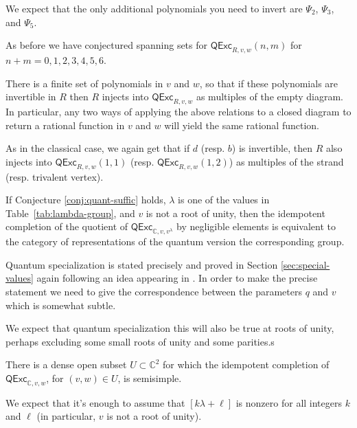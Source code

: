 \documentclass[12pt]{amsart}
\begin{document}
We expect that the only additional polynomials you need to invert are $\Psi_2$, $\Psi_3$, and $\Psi_5$.

As before we have conjectured spanning sets for $\mathsf{QExc}_{R,v,w}(n,m)$
for $n+m=0,1,2,3,4,5,6$.

\begin{conjecture}
  \label{conj:quant-consist}
There is a finite set of polynomials in $v$ and $w$, so that if these
polynomials are invertible in $R$ then $R$ injects into
$\mathsf{QExc}_{R,v,w}$ as multiples of the empty diagram.  In particular, any
two ways of applying the above relations to a closed diagram to return a
rational function in $v$ and $w$ will yield the same rational function.
\end{conjecture}

As in the classical case, we again get that if $d$ (resp. $b$) is invertible,
then $R$ also injects into $\mathsf{QExc}_{R,v,w}(1,1)$ (resp.
$\mathsf{QExc}_{R,v,w}(1,2)$) as multiples of the strand (resp. trivalent
vertex).

\begin{proposition}\label{prop:quant-spec}
  If Conjecture \ref{conj:quant-suffic} holds, $\lambda$ is one of
  the values in Table~\ref{tab:lambda-group},
  and $v$ is not a root of unity, then the idempotent completion of
  the quotient of
$\mathsf{QExc}_{\mathbb{C},v,v^\lambda}$ by negligible elements is
equivalent to the category of representations of the quantum version
the corresponding group.
\end{proposition}

Quantum specialization is stated precisely and proved in Section 
\ref{sec:special-values} again following an idea appearing in \cite{1709.01278}. 
In order to make the precise statement we need to give the correspondence
between the parameters $q$ and $v$ which is somewhat subtle.

We expect that quantum specialization this will also be true at roots of unity, 
perhaps excluding some small roots of unity and some parities.s

\begin{conjecture}
There is a dense open subset $U \subset \mathbb{C}^2$ for which the idempotent
completion of $\mathsf{QExc}_{\mathbb{C},v,w}$, for $(v,w) \in U$, is
semisimple.
\end{conjecture}

We expect that it's enough to assume that $[k \lambda + \ell]$ is nonzero for all integers $k$ and $\ell$ (in particular, $v$ is not a root of unity).
\end{document}
